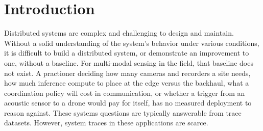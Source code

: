 \documentclass[sigconf]{acmart}
\newif\ifreviewmode
\begin{document}


\maketitle
\pagestyle{plain}

\ifreviewmode
  \begingroup
  \setcounter{tocdepth}{2}
  \footnotesize
  \tableofcontents
  \endgroup
\fi

\section{Introduction}
\label{sec:introduction}

Distributed systems are complex and challenging to design and maintain. 
Without a solid understanding of the system's behavior under various conditions, it is difficult to build a distributed system, or demonstrate an improvement to one, without a baseline. 
For multi-modal sensing in the field, that baseline does not exist. 
A practioner deciding how many cameras and recorders a site needs, how much inference compute to place at the edge versus the backhaul, what a coordination policy will cost in communication, or whether a trigger from an acoustic sensor to a drone would pay for itself, has no measured deployment to reason against.
These systems questions are typically answerable from trace datasets.
However, system traces in these applications are scarce. 
\end{document}
